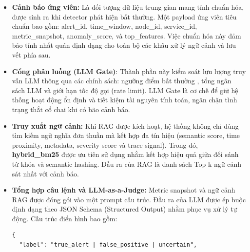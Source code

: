 \begin{itemize}[label=--]
\begin{itemize}
        \item \textbf{IsolationForestDetecto}r: Mô hình học máy dưạ trên thuật toán Isolation Forest của \textit{scikit-learn}, có khả năng học phân bố dữ liệu bình thường và cô lập các chuỗi hành vi dị thường.
    \end{itemize}
    \item \textbf{Cảnh báo ứng viên:} Là đối tượng dữ liệu trung gian mang tính chuẩn hóa, được sinh ra khi detector phát hiện bất thường. Một payload ứng viên tiêu chuẩn bao gồm: alert\_id, time\_window, node\_id, service\_id, metric\_snapshot, anomaly\_score, và top\_features. Việc chuẩn hóa này đảm bảo tính nhất quán định dạng cho toàn bộ các khâu xử lý ngữ cảnh và lưu vết phía sau.
    \item \textbf{Cổng phân luồng (LLM Gate)}: Thành phần này kiểm soát lưu lượng truy vấn LLM thông qua các chính sách: ngưỡng điểm bất thường , tổng ngân sách LLM và giới hạn tốc độ gọi (rate limit). LLM Gate là cơ chế để giữ hệ thống hoạt động ổn định và tiết kiệm tài nguyên tính toán, ngăn chặn tình trạng thắt cổ chai khi có bão cảnh báo.
    \item \textbf{Truy xuất ngữ cảnh:} Khi RAG được kích hoạt, hệ thống không chỉ dùng tìm kiếm ngữ nghĩa đơn thuần mà kết hợp đa tín hiệu (semantic score, time proximity, metadata, severity score và trace signal). Trong đó, \textbf{hybrid\_bm25} được ưu tiên sử dụng nhằm kết hợp hiệu quả giữa đối sánh từ khóa và semantic hashing. Đầu ra của RAG là danh sách Top-k ngữ cảnh sát nhất với cảnh báo.
    \item \textbf{Tổng hợp câu lệnh và LLM-as-a-Judge:} Metric snapshot và ngữ cảnh RAG được đóng gói vào một prompt cấu trúc. Đầu ra của LLM được ép buộc định dạng theo JSON Schema (Structured Output) nhằm phục vụ xử lý tự động. Cấu trúc điển hình bao gồm:
    \begin{table}[H]
\centering
\begin{tcolorbox}[
    colback=gray!5,           %
    colframe=blue!50!black,     %
    arc=4mm,                  %
    fonttitle=\small\bfseries,
    halign title=center,      %
    width=0.85\textwidth      %
]
\begin{lstlisting}[basicstyle=\small\ttfamily, columns=fullflexible, keepspaces=true]
{
  "label": "true_alert | false_positive | uncertain",

\end{lstlisting}
\end{tcolorbox}
\end{table}
\end{itemize}
